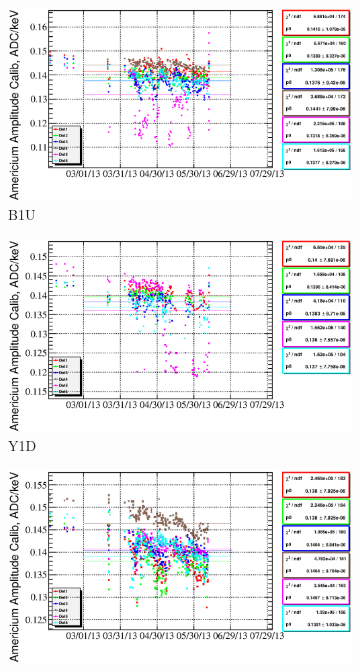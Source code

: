 \documentclass[a4paper,12pt]{article}
\begin{document}
\begin{figure}
%
\begin{subfigure}[t]{0.49\textwidth}
\includegraphics[width=\textwidth]{gfx/run13_alpha_study/B1U/c_chAmGain_by_day_B1U.eps}
\caption{B1U}
\end{subfigure}
%
\hfill
%
\begin{subfigure}[t]{0.49\textwidth}
\includegraphics[width=\textwidth]{gfx/run13_alpha_study/Y1D/c_chAmGain_by_day_Y1D.eps}
\caption{Y1D}
\end{subfigure}
%
\begin{subfigure}[t]{0.49\textwidth}
\includegraphics[width=\textwidth]{gfx/run13_alpha_study/B2D/c_chAmGain_by_day_B2D.eps}

\end{subfigure}
\end{figure}
\end{document}
